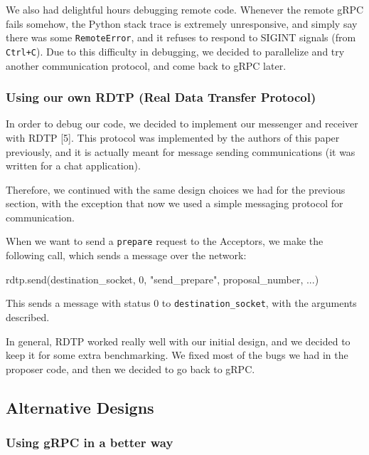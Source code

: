 \documentclass[12pt,]{article}
\newenvironment{Shaded}{\begin{snugshade}}{\end{snugshade}}
\newcommand{\DecValTok}[1]{\textcolor[rgb]{0.00,0.00,0.81}{{#1}}}
\newcommand{\StringTok}[1]{\textcolor[rgb]{0.31,0.60,0.02}{{#1}}}
\newcommand{\NormalTok}[1]{{#1}}
\begin{document}
We also had delightful hours debugging remote code. Whenever the remote
gRPC fails somehow, the Python stack trace is extremely unresponsive,
and simply say there was some \texttt{RemoteError}, and it refuses to
respond to SIGINT signals (from \texttt{Ctrl+C}). Due to this difficulty
in debugging, we decided to parallelize and try another communication
protocol, and come back to gRPC later.

\subsubsection{Using our own RDTP (Real Data Transfer
Protocol)}\label{using-our-own-rdtp-real-data-transfer-protocol}

In order to debug our code, we decided to implement our messenger and
receiver with RDTP {[}5{]}. This protocol was implemented by the authors
of this paper previously, and it is actually meant for message sending
communications (it was written for a chat application).

Therefore, we continued with the same design choices we had for the
previous section, with the exception that now we used a simple messaging
protocol for communication.

When we want to send a \texttt{prepare} request to the Acceptors, we
make the following call, which sends a message over the network:

\begin{Shaded}
\begin{Highlighting}[]
\NormalTok{rdtp.send(destination_socket, }\DecValTok{0}\NormalTok{, }\StringTok{"send_prepare"}\NormalTok{, proposal_number, ...) }
\end{Highlighting}
\end{Shaded}

This sends a message with status \(0\) to \texttt{destination\_socket},
with the arguments described.

In general, RDTP worked really well with our initial design, and we
decided to keep it for some extra benchmarking. We fixed most of the
bugs we had in the proposer code, and then we decided to go back to
gRPC.

\subsection{Alternative Designs}\label{alternative-designs}

\subsubsection{Using gRPC in a better
way}\label{using-grpc-in-a-better-way}
\end{document}
